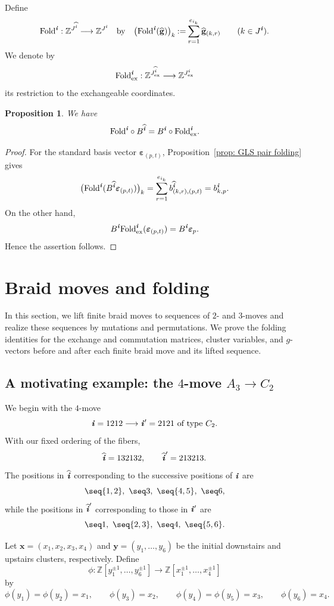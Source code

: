 \documentclass[12pt, leqno]{amsart}
\numberwithin{equation}{section}
\theoremstyle{plain}
\newtheorem{proposition}[lemma]{Proposition}
\theoremstyle{definition}
\newcommand{\seteq}{\mathbin{:=}}
\newcommand{\ex}{\mathrm{ex}}
\newcommand{\ve}{\boldsymbol{\varepsilon}}
\newcommand{\Fold}{{\rm Fold}}
\newcommand{\ii}{ \textbf{\textit{i}}}
\newcommand{\hii}{{\widehat{\ii}}}
\newcommand{\bbZ}{\mathbb{Z}}
\newcommand{\hbfg}{\widehat{\bfg}}
\newcommand{\bfg}{\mathbf{g}}
\newcommand{\bfx}{\mathbf{x}}
\newcommand{\bfy}{\mathbf{y}}
\begin{document}
Define
\begin{equation}\label{eq: g vector folding map}
\Fold^\ii:\mathbb Z^{J^\hii}\longrightarrow\mathbb Z^{J^\ii}
\ \ \text{ by } \ \
\bigl(\Fold^\ii(\hbfg)\bigr)_k \seteq \sum_{r=1}^{e_{i_k}}\hbfg_{(k,r)} \qquad (k\in J^\ii).
\end{equation}
We denote by
\[
\Fold^\ii_{\ex}: \mathbb Z^{J^\hii_{\ex}}\longrightarrow \mathbb Z^{J^\ii_{\ex}}
\]
its restriction to the exchangeable coordinates.

\begin{proposition}\label{prop: Fold B intertwining}
We have
\[
\Fold^\ii\circ B^\hii = B^\ii\circ\Fold^\ii_{\ex}.
\]
\end{proposition}

\begin{proof}
For the standard basis vector $\ve_{(p,t)}$,
Proposition~\ref{prop: GLS pair folding} gives
\[
\bigl(\Fold^\ii(B^\hii\ve_{(p,t)})\bigr)_k
= \sum_{r=1}^{e_{i_k}} b^\hii_{(k,r),(p,t)}
= b^\ii_{k,p}.
\]
On the other hand,
\[
B^\ii\Fold^\ii_{\ex}(\ve_{(p,t)}) = B^\ii\ve_p.
\]
Hence the assertion follows.
\end{proof}

\section{Braid moves and folding} \label{sec: braid}

 In this section, we lift finite braid moves to sequences of $2$-
and $3$-moves and realize these sequences by mutations and
permutations. We prove the folding identities for the exchange
and commutation matrices, cluster variables, and $g$-vectors
before and after each finite braid move and its lifted sequence.{}

\subsection{A motivating example: the $4$-move $A_3\to C_2$} \label{subsec: motivating ex braid}

We begin with the $4$-move
\[
\ii=1212\longrightarrow \ii'=2121 \text{ of type $C_2$.}
\]
With our fixed ordering of the fibers,
\[
\hii=132132,\qquad \hii'=213213.
\]
 The positions in $\hii$ corresponding to the successive positions of $\ii$ are
\[
\seq{1,2},\ \seq3,\ \seq{4,5},\ \seq6,
\]
 while the positions in $\hii'$ corresponding to those in $\ii'$ are
\[
\seq1,\ \seq{2,3},\ \seq4,\ \seq{5,6}.
\]

Let $\bfx=(x_1,x_2,x_3,x_4)$ and $\bfy=(y_1,\ldots,y_6)$ be  the initial downstairs and upstairs clusters, respectively.
Define
\[
\phi:\bbZ[y_1^{\pm1},\ldots,y_6^{\pm1}]
\longrightarrow
\bbZ[x_1^{\pm1},\ldots,x_4^{\pm1}]
\]
by
\[
\phi(y_1)=\phi(y_2)=x_1,\qquad \phi(y_3)=x_2,\qquad \phi(y_4)=\phi(y_5)=x_3,\qquad \phi(y_6)=x_4.
\]
\end{document}
